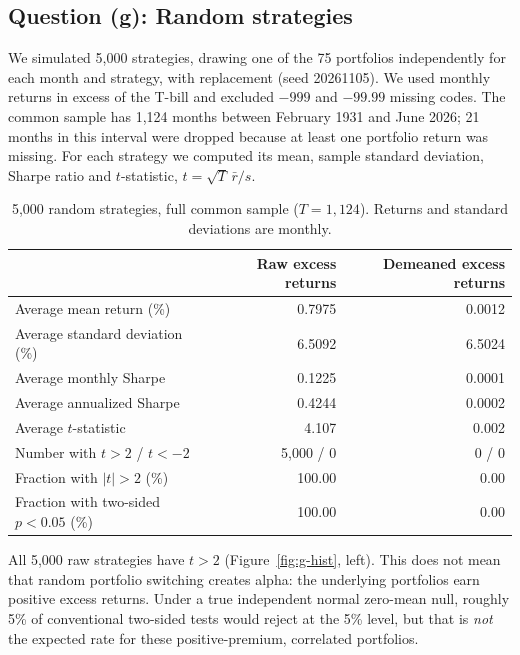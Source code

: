 
\subsection*{Question (g): Random strategies}

We simulated 5,000 strategies, drawing one of the 75 portfolios independently
for each month and strategy, with replacement (seed 20261105). We used monthly
returns in excess of the T-bill and excluded $-999$ and $-99.99$ missing
codes. The common sample has 1,124 months between February 1931 and June 2026;
21 months in this interval were dropped because at least one portfolio return
was missing. For each strategy we computed its mean, sample standard deviation,
Sharpe ratio and $t$-statistic, $t=\sqrt{T}\,\bar r/s$.

\begin{table}[htbp]
\centering\small
\caption{5,000 random strategies, full common sample ($T=1{,}124$). Returns and standard deviations are monthly.}
\label{tab:gfull}
\begin{tabular}{lrr}
\toprule
 & Raw excess returns & Demeaned excess returns\\
\midrule
Average mean return (\%) & 0.7975 & 0.0012\\
Average standard deviation (\%) & 6.5092 & 6.5024\\
Average monthly Sharpe & 0.1225 & 0.0001\\
Average annualized Sharpe & 0.4244 & 0.0002\\
Average $t$-statistic & 4.107 & 0.002\\
Number with $t>2$ / $t<-2$ & 5,000 / 0 & 0 / 0\\
Fraction with $|t|>2$ (\%) & 100.00 & 0.00\\
Fraction with two-sided $p<0.05$ (\%) & 100.00 & 0.00\\
\bottomrule
\end{tabular}
\end{table}

All 5,000 raw strategies have $t>2$ (Figure~\ref{fig:g-hist}, left). This does not mean that random
portfolio switching creates alpha: the underlying portfolios earn positive
excess returns. Under a true independent normal zero-mean null, roughly 5\%
of conventional two-sided tests would reject at the 5\% level, but that is
\emph{not} the expected rate for these positive-premium, correlated portfolios.

